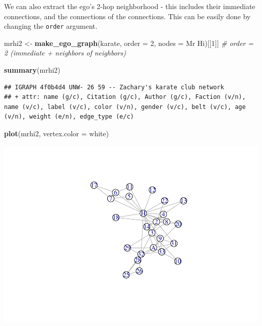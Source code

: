 \documentclass[
]{book}
\newenvironment{Shaded}{\begin{snugshade}}{\end{snugshade}}
\newcommand{\AttributeTok}[1]{\textcolor[rgb]{0.13,0.29,0.53}{#1}}
\newcommand{\CommentTok}[1]{\textcolor[rgb]{0.56,0.35,0.01}{\textit{#1}}}
\newcommand{\DecValTok}[1]{\textcolor[rgb]{0.00,0.00,0.81}{#1}}
\newcommand{\FunctionTok}[1]{\textcolor[rgb]{0.13,0.29,0.53}{\textbf{#1}}}
\newcommand{\NormalTok}[1]{#1}
\newcommand{\OtherTok}[1]{\textcolor[rgb]{0.56,0.35,0.01}{#1}}
\newcommand{\StringTok}[1]{\textcolor[rgb]{0.31,0.60,0.02}{#1}}
\begin{document}
We can also extract the ego's 2-hop neighborhood - this includes their immediate connections, and the connections of the connections. This can be easily done by changing the \texttt{order} argument.

\begin{Shaded}
\begin{Highlighting}[]
\NormalTok{mrhi2 }\OtherTok{\textless{}{-}} \FunctionTok{make\_ego\_graph}\NormalTok{(karate, }\AttributeTok{order =} \DecValTok{2}\NormalTok{, }\AttributeTok{nodes =} \StringTok{\textquotesingle{}Mr Hi\textquotesingle{}}\NormalTok{)[[}\DecValTok{1}\NormalTok{]] }\CommentTok{\# order = 2 (immediate + neighbors of neighbors)}

\FunctionTok{summary}\NormalTok{(mrhi2)}
\end{Highlighting}
\end{Shaded}

\begin{verbatim}
## IGRAPH 4f0b4d4 UNW- 26 59 -- Zachary's karate club network
## + attr: name (g/c), Citation (g/c), Author (g/c), Faction (v/n), name (v/c), label (v/c), color (v/n), gender (v/c), belt (v/c), age (v/n), weight (e/n), edge_type (e/c)
\end{verbatim}

\begin{Shaded}
\begin{Highlighting}[]
\FunctionTok{plot}\NormalTok{(mrhi2, }\AttributeTok{vertex.color =} \StringTok{\textquotesingle{}white\textquotesingle{}}\NormalTok{)}
\end{Highlighting}
\end{Shaded}

\includegraphics{bookdown-demo_files/figure-latex/unnamed-chunk-91-1.pdf}
\end{document}
